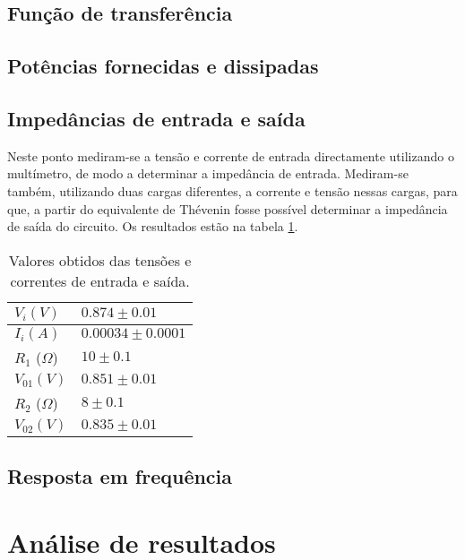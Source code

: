 \documentclass[%
  reprint,
  nofootinbib,
  amsmath,amssymb,
  aps,
  10pt,
  a4paper
]{revtex4-1}
\begin{document}
\subsection{Função de transferência}
\subsection{Potências fornecidas e dissipadas}
\subsection{Impedâncias de entrada e saída}
Neste ponto mediram-se a tensão e corrente de entrada directamente utilizando o multímetro, de modo a determinar a impedância de entrada. Mediram-se também, utilizando duas cargas diferentes, a corrente e tensão nessas cargas, para que, a partir do equivalente de Thévenin fosse possível determinar a impedância de saída do circuito. Os resultados estão na tabela \ref{tab:impedancia}.

\begin{table}[h]
    \begin{tabular}{|l|l|}
\hline
         $ V_i (V)$	&	$0.874  \pm 0.01$		                    \\ \hline
	$I_i (A)$	&	$0.00034 \pm 0.0001$			\\ \hline 
	$R_1$ ($\Omega$) &	$10\pm0.1$			 \\ \hline
	$V_{01}  (V)$	&   	$0.851\pm0.01$	                       \\ \hline
           $R_2$ ($\Omega$) &  $8\pm0.1$   \\ \hline
           $V_{02} (V)$ &   $0.835 \pm 0.01$ \\ \hline

    \end{tabular}
    \caption{Valores obtidos das tensões e correntes de entrada e saída.}
    \label{tab:impedancia}
\end{table}





\subsection{Resposta em frequência}






\section{Análise de resultados}
\label{s:aresul}
\end{document}
